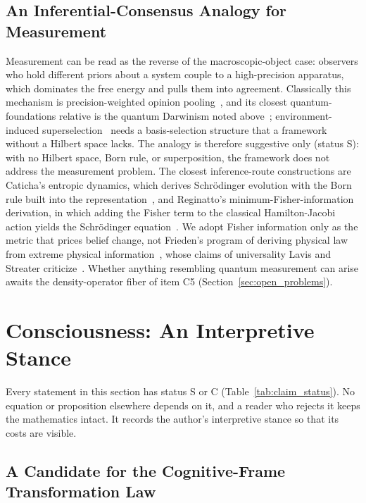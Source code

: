\documentclass[11pt]{article}
\begin{document}
\subsection{An Inferential-Consensus Analogy for Measurement}
\label{sec:measurement_analogy}

Measurement can be read as the reverse of the macroscopic-object case: observers who hold different priors about a system couple to a high-precision apparatus, which dominates the free energy and pulls them into agreement. Classically this mechanism is precision-weighted opinion pooling~\cite{degroot1974, Aumann1976}, and its closest quantum-foundations relative is the quantum Darwinism noted above~\cite{Zurek2009}; environment-induced superselection~\cite{Zurek2003} needs a basis-selection structure that a framework without a Hilbert space lacks. The analogy is therefore suggestive only (status S): with no Hilbert space, Born rule, or superposition, the framework does not address the measurement problem. The closest inference-route constructions are Caticha's entropic dynamics, which derives Schr\"odinger evolution with the Born rule built into the representation~\cite{Caticha2015, Caticha2019, JohnsonCaticha2011}, and Reginatto's minimum-Fisher-information derivation, in which adding the Fisher term to the classical Hamilton-Jacobi action yields the Schr\"odinger equation~\cite{reginatto1998derivation}. We adopt Fisher information only as the metric that prices belief change, not Frieden's program of deriving physical law from extreme physical information~\cite{frieden1998physics}, whose claims of universality Lavis and Streater criticize~\cite{LavisStreater2002}. Whether anything resembling quantum measurement can arise awaits the density-operator fiber of item C5 (Section~\ref{sec:open_problems}).

\section{Consciousness: An Interpretive Stance}\label{sec:consciousness}

Every statement in this section has status S or C (Table~\ref{tab:claim_status}). No equation or proposition elsewhere depends on it, and a reader who rejects it keeps the mathematics intact. It records the author's interpretive stance so that its costs are visible.

\subsection{A Candidate for the Cognitive-Frame Transformation Law}
\label{sec:lahav_convergence}
\end{document}
